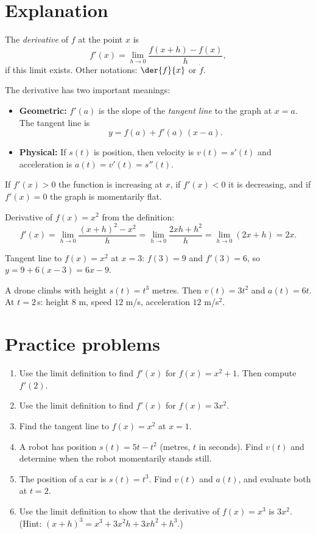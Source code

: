 \label{ch:derivative}

\section*{Explanation}
\begin{definition}
The \emph{derivative} of $f$ at the point $x$ is
\[
f'(x)=\lim_{h\to 0}\frac{f(x+h)-f(x)}{h},
\]
if this limit exists. Other notations: $\der{f}{x}$ or $\dot f$.
\end{definition}

The derivative has two important meanings:
\begin{itemize}
  \item \textbf{Geometric:} $f'(a)$ is the slope of the \emph{tangent line} to the graph at $x=a$. The tangent line is
  \[
  y = f(a) + f'(a)\,(x-a).
  \]
  \item \textbf{Physical:} If $s(t)$ is position, then velocity is $v(t)=s'(t)$ and acceleration is $a(t)=v'(t)=s''(t)$.
\end{itemize}
If $f'(x)>0$ the function is increasing at $x$, if $f'(x)<0$ it is decreasing, and if $f'(x)=0$ the graph is momentarily flat.

\begin{example}
Derivative of $f(x)=x^2$ from the definition:
\[
f'(x)=\lim_{h\to0}\frac{(x+h)^2-x^2}{h}=\lim_{h\to0}\frac{2xh+h^2}{h}=\lim_{h\to0}(2x+h)=2x.
\]
\end{example}

\begin{example}
Tangent line to $f(x)=x^2$ at $x=3$: $f(3)=9$ and $f'(3)=6$, so $y=9+6(x-3)=6x-9$.
\end{example}

\begin{example}
A drone climbs with height $s(t)=t^3$ metres. Then $v(t)=3t^2$ and $a(t)=6t$. At $t=2$\,s: height $8$ m, speed $12$ m/s, acceleration $12$ m/s$^2$.
\end{example}

\section*{Practice problems}
\begin{enumerate}[label=\textbf{\thechapter.\arabic*}]
  \item Use the limit definition to find $f'(x)$ for $f(x)=x^2+1$. Then compute $f'(2)$.
  \item Use the limit definition to find $f'(x)$ for $f(x)=3x^2$.
  \item Find the tangent line to $f(x)=x^2$ at $x=1$.
  \item A robot has position $s(t)=5t-t^2$ (metres, $t$ in seconds). Find $v(t)$ and determine when the robot momentarily stands still.
  \item The position of a car is $s(t)=t^3$. Find $v(t)$ and $a(t)$, and evaluate both at $t=2$.
  \item[\textbf{2.6}$\star$] Use the limit definition to show that the derivative of $f(x)=x^3$ is $3x^2$. (Hint: $(x+h)^3=x^3+3x^2h+3xh^2+h^3$.)
\end{enumerate}

